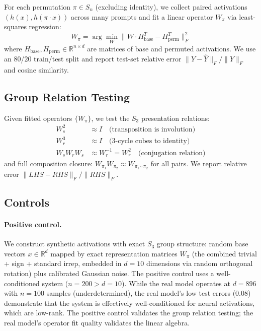 \documentclass[10pt, letterpaper]{article}
\begin{document}
For each permutation $\pi \in S_n$ (excluding identity), we collect paired activations $(h(x), h(\pi \cdot x))$ across many prompts and fit a linear operator $W_\pi$ via least-squares regression:
\begin{equation}
    W_\pi = \arg\min_W \|W \cdot H_\text{base}^T - H_\text{perm}^T\|_F^2
\end{equation}
where $H_\text{base}, H_\text{perm} \in \mathbb{R}^{n \times d}$ are matrices of base and permuted activations. We use an 80/20 train/test split and report test-set relative error $\|Y - \hat{Y}\|_F / \|Y\|_F$ and cosine similarity.

\subsection{Group Relation Testing}

Given fitted operators $\{W_\pi\}$, we test the $S_3$ presentation relations:
\begin{align}
    W_s^2 &\approx I \quad \text{(transposition is involution)} \\
    W_r^3 &\approx I \quad \text{(3-cycle cubes to identity)} \\
    W_s W_r W_s &\approx W_r^{-1} = W_r^2 \quad \text{(conjugation relation)}
\end{align}
and full composition closure: $W_{\pi_1} W_{\pi_2} \approx W_{\pi_1 \circ \pi_2}$ for all pairs. We report relative error $\|LHS - RHS\|_F / \|RHS\|_F$.

\subsection{Controls}

\paragraph{Positive control.} We construct synthetic activations with exact $S_3$ group structure: random base vectors $x \in \mathbb{R}^d$ mapped by exact representation matrices $W_\pi$ (the combined trivial + sign + standard irrep, embedded in $d = 10$ dimensions via random orthogonal rotation) plus calibrated Gaussian noise. The positive control uses a well-conditioned system ($n = 200 > d = 10$). While the real model operates at $d = 896$ with $n = 100$ samples (underdetermined), the real model's low test errors (0.08) demonstrate that the system is effectively well-conditioned for neural activations, which are low-rank. The positive control validates the group relation testing; the real model's operator fit quality validates the linear algebra.
\end{document}
